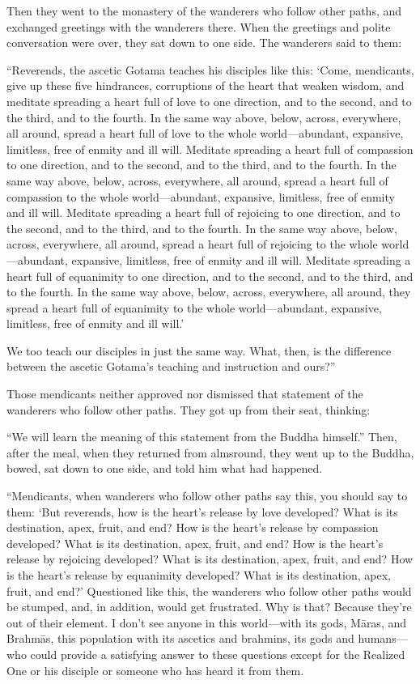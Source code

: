 \documentclass[12pt,openany]{book}%
\begin{document}
Then they went to the monastery of the wanderers who follow other paths, and exchanged greetings with the wanderers there. When the greetings and polite conversation were over, they sat down to one side. The wanderers said to them: 

“Reverends, the ascetic Gotama teaches his disciples like this: ‘Come, mendicants, give up these five hindrances, corruptions of the heart that weaken wisdom, and meditate spreading a heart full of love to one direction, and to the second, and to the third, and to the fourth. In the same way above, below, across, everywhere, all around, spread a heart full of love to the whole world—abundant, expansive, limitless, free of enmity and ill will. Meditate spreading a heart full of compassion to one direction, and to the second, and to the third, and to the fourth. In the same way above, below, across, everywhere, all around, spread a heart full of compassion to the whole world—abundant, expansive, limitless, free of enmity and ill will. Meditate spreading a heart full of rejoicing to one direction, and to the second, and to the third, and to the fourth. In the same way above, below, across, everywhere, all around, spread a heart full of rejoicing to the whole world—abundant, expansive, limitless, free of enmity and ill will. Meditate spreading a heart full of equanimity to one direction, and to the second, and to the third, and to the fourth. In the same way above, below, across, everywhere, all around, they spread a heart full of equanimity to the whole world—abundant, expansive, limitless, free of enmity and ill will.’ 

We too teach our disciples in just the same way. What, then, is the difference between the ascetic Gotama’s teaching and instruction and ours?” 

Those mendicants neither approved nor dismissed that statement of the wanderers who follow other paths. They got up from their seat, thinking: 

“We will learn the meaning of this statement from the Buddha himself.” Then, after the meal, when they returned from almsround, they went up to the Buddha, bowed, sat down to one side, and told him what had happened. 

“Mendicants, when wanderers who follow other paths say this, you should say to them: ‘But reverends, how is the heart’s release by love developed? What is its destination, apex, fruit, and end? How is the heart’s release by compassion developed? What is its destination, apex, fruit, and end? How is the heart’s release by rejoicing developed? What is its destination, apex, fruit, and end? How is the heart’s release by equanimity developed? What is its destination, apex, fruit, and end?’ Questioned like this, the wanderers who follow other paths would be stumped, and, in addition, would get frustrated. Why is that? Because they’re out of their element. I don’t see anyone in this world—with its gods, \textsanskrit{Māras}, and \textsanskrit{Brahmās}, this population with its ascetics and brahmins, its gods and humans—who could provide a satisfying answer to these questions except for the Realized One or his disciple or someone who has heard it from them. 
\end{document}
